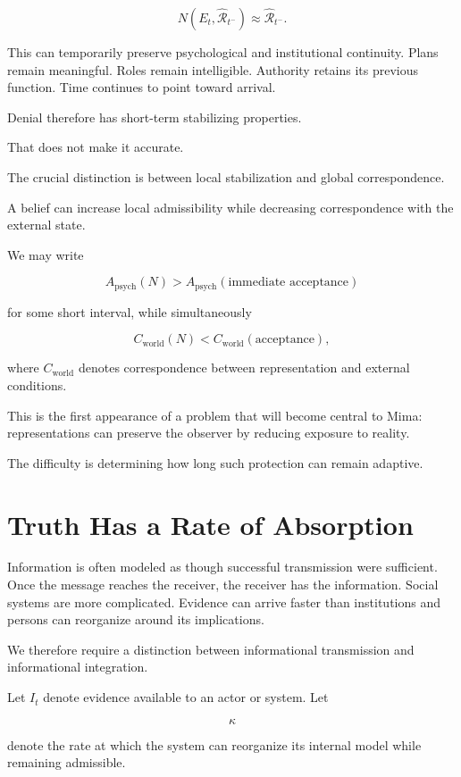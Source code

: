 \documentclass[11pt,oneside]{book}
\theoremstyle{definition}
\theoremstyle{remark}
\newcommand{\R}{\mathcal{R}}
\begin{document}
\[
N(E_t,\widehat{\R}_{t^-})
\approx
\widehat{\R}_{t^-}.
\]

This can temporarily preserve psychological and institutional continuity. Plans remain meaningful. Roles remain intelligible. Authority retains its previous function. Time continues to point toward arrival.

Denial therefore has short-term stabilizing properties.

That does not make it accurate.

The crucial distinction is between local stabilization and global correspondence.

A belief can increase local admissibility while decreasing correspondence with the external state.

We may write

\[
A_{\mathrm{psych}}(N)>A_{\mathrm{psych}}(\text{immediate acceptance})
\]

for some short interval, while simultaneously

\[
C_{\mathrm{world}}(N)
<
C_{\mathrm{world}}(\text{acceptance}),
\]

where \(C_{\mathrm{world}}\) denotes correspondence between representation and external conditions.

This is the first appearance of a problem that will become central to Mima: representations can preserve the observer by reducing exposure to reality.

The difficulty is determining how long such protection can remain adaptive.

\section{Truth Has a Rate of Absorption}

Information is often modeled as though successful transmission were sufficient. Once the message reaches the receiver, the receiver has the information. Social systems are more complicated. Evidence can arrive faster than institutions and persons can reorganize around its implications.

We therefore require a distinction between informational transmission and informational integration.

Let \(I_t\) denote evidence available to an actor or system. Let

\[
\kappa
\]

denote the rate at which the system can reorganize its internal model while remaining admissible.
\end{document}
